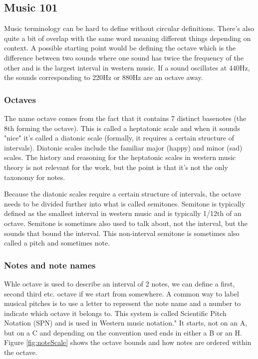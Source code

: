 \subsection{Music 101} 
Music terminology can be hard to define without circular definitions. There's also quite a bit of overlap with the same word meaning different things depending on context. A possible starting point would be defining the octave which is the difference between two sounds where one sound has twice the frequency of the other and is the largest interval in western music. If a sound oscillates at 440Hz, the sounds corresponding to 220Hz or 880Hz are an octave away.


\subsubsection{Octaves}
The name octave comes from the fact that it contains 7 distinct basenotes (the 8th forming the octave). This is called a heptatonic scale and when it sounds "nice" it's called a diatonic scale (formally, it requires a certain structure of intervals). Diatonic scales include the familiar major (happy) and minor (sad) scales. The history and reasoning for the heptatonic scales in western music theory is not relevant for the work, but the point is that it's not the only taxonomy for notes. 

Because the diatonic scales require a certain structure of intervals, the octave needs to be divided further into what is called semitones. Semitone is typically defined as the smallest interval in western music and is typically 1/12th of an octave. Semitone is sometimes also used to talk about, not the interval, but the sounds that bound the interval. This non-interval semitone is sometimes also called a pitch and sometimes note.

\subsubsection{Notes and note names}
Whle octave is used to describe an interval of 2 notes, we can define a first, second third etc. octave if we start from somewhere. A common way to label musical pitches is to use a letter to represent the note name and a number to indicate which octave it belongs to. This system is called Scientific Pitch Notation (SPN) and is used in Western music notation." It starts, not on an A, but on a C and depending on the convention used ends in either a B or an H. Figure \ref{fig:noteScale} shows the octave bounds and how notes are ordered within the octave.


